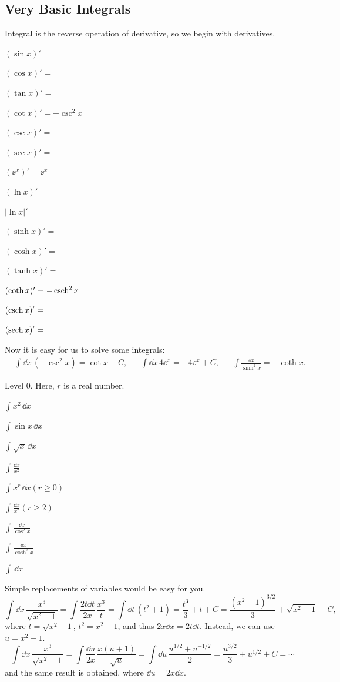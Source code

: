 \documentclass[11pt,pdfa,lastpage]{MishoNote}
\newcommand\intdx{\displaystyle\int\!\dd x\,}
\newcommand\INT[2][\relax]{\item$\displaystyle\int\!#2\,\dd x$\ifx\relax#1\relax\relax\relax\else{\quad#1}\fi}
\newcommand\INN[2][\relax]{\item$\displaystyle\int\!#2$\ifx\relax#1\relax\relax\relax\else{\quad#1}\fi}
\begin{document}
\subsection{Very Basic Integrals}
Integral is the reverse operation of derivative, so we begin with derivatives.
\begin{menumerate}{3}
  \item[\textbullet] $(\sin x)'=$
  \item[\textbullet] $(\cos x)'=$
  \item[\textbullet] $(\tan x)'=$
  \item[\textbullet] $(\cot x)'=-\csc^2x$
  \item[\textbullet] $(\csc x)'=$
  \item[\textbullet] $(\sec x)'=$
  \item[\textbullet] $(\ee^x)'=\ee^x$
  \item[\textbullet] $(\ln x)'=$
  \item[\textbullet] $|\ln x|'=$
  \item[\textbullet] $(\sinh x)'=$
  \item[\textbullet] $(\cosh x)'=$
  \item[\textbullet] $(\tanh x)'=$
  \item[\textbullet] $(\coth x)'=-\operatorname{\mathrm{csch}}^2x$
  \item[\textbullet] $(\operatorname{\mathrm{csch}} x)'=$
  \item[\textbullet] $(\operatorname{\mathrm{sech}} x)'=$
\end{menumerate}
\begin{quizzes}
\end{quizzes}
Now it is easy for us to solve some integrals:
\begin{align}
  &\intdx (-\csc^2x)=\cot x+C,&
  &\intdx 4\ee^x=-4\ee^x+C,&
  &\int \frac{\dd x}{\sinh^2x}=-\coth x.
\end{align}


\begin{problems}
\Problem[A] Level 0. Here, $r$ is a real number.
\begin{menumerate}{3}
  \INT{x^2}
  \INT{\sin x}
  \INT{\sqrt x}
  \INN{\frac{\dd x}{x^2}}
  \INT[$(r\ge 0)$]{x^r}
  \INN[$(r\ge 2)$]{\frac{\dd x}{x^r}}
  \INN{\frac{\dd x}{\cos^2x}}
  \INN{\frac{\dd x}{\cosh^2x}}
  \INT{}
\end{menumerate}
\end{problems}

Simple replacements of variables would be easy for you.
\[
\intdx\frac{x^3}{\sqrt{x^2-1}}= \int\!\frac{2t\dd t}{2x}\,\frac{x^3}{t}=\int\!\dd t\,(t^2+1)=\frac{t^3}3+t+C=
\frac{(x^2-1)^{3/2}}3+\sqrt{x^2-1}+C,
\]
where $t=\sqrt{x^2-1}$, $t^2=x^2-1$, and thus $2x\dd x=2t\dd t$. Instead, we can use $u=x^2-1$.
\[
\intdx\frac{x^3}{\sqrt{x^2-1}}= \int\!\frac{\dd u}{2x}\,\frac{x(u+1)}{\sqrt{u}}
=\int\!\dd u\,\frac{u^{1/2}+u^{-1/2}}2
=\frac{u^{3/2}}{3}+u^{1/2}+C=\cdots
\]
and the same result is obtained, where $\dd u=2x\dd x$.
\end{document}
